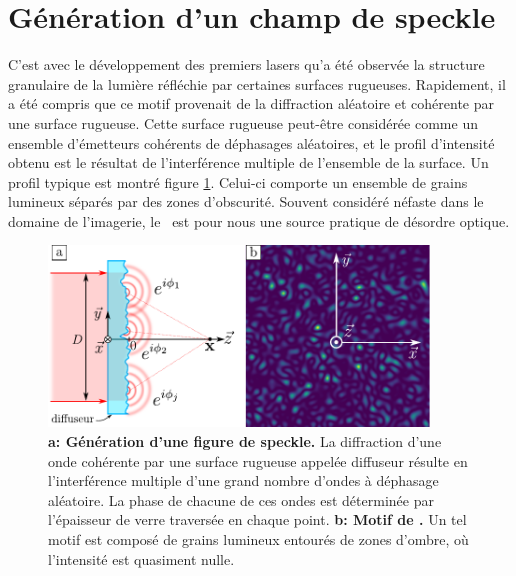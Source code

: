 \section{Génération d'un champ de speckle}
C'est avec le développement des premiers lasers qu'a été observée la structure granulaire de la lumière réfléchie par certaines surfaces rugueuses. Rapidement, il a été compris que ce motif provenait de la diffraction aléatoire et cohérente par une surface rugueuse. 
Cette surface rugueuse peut-être considérée comme un ensemble d'émetteurs cohérents de déphasages aléatoires, et le profil d'intensité obtenu est le résultat de l'interférence multiple de l'ensemble de la surface. Un profil typique est montré figure \ref{fig:speckle_pattern}. Celui-ci comporte un ensemble de grains lumineux séparés par des zones d'obscurité.
Souvent considéré néfaste dans le domaine de l'imagerie, le \speckle\ est pour nous une source pratique de désordre optique. 

\begin{figure}
\centering
\includegraphics[width=0.9\textwidth]{Fig/Speckle/speckle_pattern.pdf}
\caption{\textbf{a: Génération d'une figure de speckle.} La diffraction d'une onde cohérente par une surface rugueuse appelée diffuseur résulte en l'interférence multiple d'une grand nombre d'ondes à déphasage aléatoire. La phase de chacune de ces ondes est déterminée par l'épaisseur de verre traversée en chaque point. \textbf{b: Motif de \speckle .} Un tel motif est composé de grains lumineux entourés de zones d'ombre, où l'intensité est quasiment nulle. }
\label{fig:speckle_pattern}
\end{figure}



